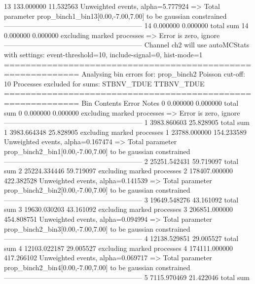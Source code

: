 13         133.000000      11.532563       Unweighted events, alpha=5.777924
  => Total parameter prop_binch1_bin13[0.00,-7.00,7.00] to be gaussian constrained
------------------------------------------------------------
14         0.000000        0.000000        total sum                     
14         0.000000        0.000000        excluding marked processes    
  => Error is zero, ignore      
------------------------------------------------------------
Channel ch2 will use autoMCStats with settings: event-threshold=10, include-signal=0, hist-mode=1
============================================================
Analysing bin errors for: prop_binch2
Poisson cut-off: 10
Processes excluded for sums: STBNV_TDUE TTBNV_TDUE
============================================================
Bin        Contents        Error           Notes                         
0          0.000000        0.000000        total sum                     
0          0.000000        0.000000        excluding marked processes    
  => Error is zero, ignore      
------------------------------------------------------------
1          3983.860603     25.828905       total sum                     
1          3983.664348     25.828905       excluding marked processes    
1          23788.000000    154.233589      Unweighted events, alpha=0.167474
  => Total parameter prop_binch2_bin1[0.00,-7.00,7.00] to be gaussian constrained
------------------------------------------------------------
2          25251.542431    59.719097       total sum                     
2          25224.334446    59.719097       excluding marked processes    
2          178407.000000   422.382528      Unweighted events, alpha=0.141539
  => Total parameter prop_binch2_bin2[0.00,-7.00,7.00] to be gaussian constrained
------------------------------------------------------------
3          19649.548276    43.161092       total sum                     
3          19630.030203    43.161092       excluding marked processes    
3          206851.000000   454.808751      Unweighted events, alpha=0.094994
  => Total parameter prop_binch2_bin3[0.00,-7.00,7.00] to be gaussian constrained
------------------------------------------------------------
4          12138.529851    29.005527       total sum                     
4          12103.022187    29.005527       excluding marked processes    
4          174111.000000   417.266102      Unweighted events, alpha=0.069717
  => Total parameter prop_binch2_bin4[0.00,-7.00,7.00] to be gaussian constrained
------------------------------------------------------------
5          7115.970469     21.422046       total sum                     
